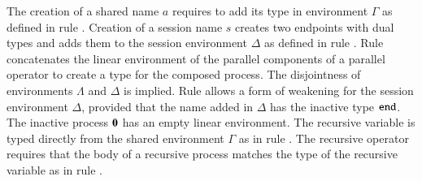 The creation of a
shared name $a$ requires to add
its type in environment $\Gamma$ as defined in 
rule . 
Creation of a session name $s$
creates two endpoints with dual types and adds them to
the session environment 
$\Delta$ as defined in rule . 
Rule  concatenates the linear environment of
the parallel components of a parallel operator
to create a type for the composed process.
The disjointness of environments $\Lambda$ and $\Delta$
is implied. Rule  allows a form of weakening 
for the session environment $\Delta$, provided that
the name added in $\Delta$ has the inactive
type $\mathtt{end}$. The inactive process $\mathbf{0}$ has an empty
linear environment. The recursive variable is typed
directly from the shared environment $\Gamma$ as
in rule .
The recursive operator requires that the body of
a recursive process matches the type of the recursive
variable as in rule .

\begin{comment}
\subsection{Order of Types}

In~\cite{tlca07} the type syntax for values includes the definition
$U_1 \sharedop U_2$ and $U_1 \lollipop U_2$, that
allows us to define types of arbitrary order $k$.
An abstraction of $k$-order types requires to extend the syntax
to include higher-order applications:
\[
	\abs{z}{\binp{z}{x} \appl{x}{\abs{y} Q}}
\]
with with the type of $\abs{y}{Q}$ being of order
$k-1$. The type of of such an abstraction in the current setting would
be $\shot{U}$ (or $\lhot{U}$) with the order of the type being defined
as the number of nested higher-order types~\cite{San96int}.

In the type system we develop for the \HOp we only have
types of the form $\shot{C}$.
If we maintain the definition of counting the order
of the type as the nesting of higher-order types we
can still express $k$-order types, e.g:
\[
	\shot{(\btinp{U} \tinact)}
\]
with $U$ being of order $k-1$.
An $k$-order abstraction in \HOp would be:
\[
	\abs{z}{\binp{z}{x} \binp{x}{y} \appl{y}{n}}
\]
with $y$ being of order $k-1$.

\begin{definition}[Order of Value Type]\rm
	\label{def:order_type}
	Let type $U$ and value $V$ such that $\Gamma; \Lambda; \Delta \proves V \hastype U$.
	The order of $U$ is the number of using rule $\trule{Abs}$
	in the typing derivation $\Gamma; \Lambda; \Delta \proves V \hastype U$.
\end{definition}
\end{comment}

